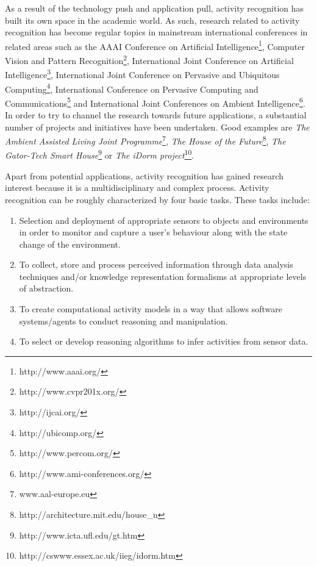 As a result of the technology push and application pull, activity recognition has built its own space in the academic world. As such, research related to activity recognition has become regular topics in mainstream international conferences in related areas such as the AAAI Conference on Artificial Intelligence\footnote{http://www.aaai.org/}, Computer Vision and Pattern Recognition\footnote{http://www.cvpr201x.org/}, International Joint Conference on Artificial Intelligence\footnote{http://ijcai.org/}, International Joint Conference on Pervasive and Ubiquitous Computing\footnote{http://ubicomp.org/}, International Conference on Pervasive Computing and Communications\footnote{http://www.percom.org/} and International Joint Conferences on Ambient Intelligence\footnote{http://www.ami-conferences.org/}. In order to try to channel the research towards future applications, a substantial number of projects and initiatives have been undertaken. Good examples are \textit{The Ambient Assisted Living Joint Programme}\footnote{www.aal-europe.eu}, \textit{The House of the Future}\footnote{http://architecture.mit.edu/house\_n}, \textit{The Gator-Tech Smart House}\footnote{http://www.icta.ufl.edu/gt.htm} or \textit{The iDorm project}\footnote{http://cswww.essex.ac.uk/iieg/idorm.htm}.  %

Apart from potential applications, activity recognition has gained research interest because it is a multidisciplinary and complex process. Activity recognition can be roughly characterized by four basic tasks. These tasks include:
\begin{enumerate}
 \item Selection and deployment of appropriate sensors to objects and environments in order to monitor and capture a user’s behaviour along with the state change of the environment.
 \item To collect, store and process perceived information through data analysis techniques and/or knowledge representation formalisms at appropriate levels of abstraction.
 \item To create computational activity models in a way that allows software systems/agents to conduct reasoning and manipulation.
 \item To select or develop reasoning algorithms to infer activities from sensor data.
\end{enumerate}

